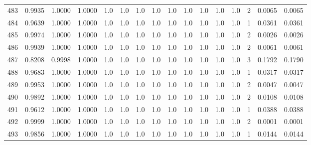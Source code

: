 \begin{tabular}{lrrrrrrrrrrrrrrr}
483 &      0.9935 &  1.0000 &  1.0000 &     1.0 &     1.0 &     1.0 &     1.0 &     1.0 &     1.0 &     1.0 &      1.0 &        1.0 &      2 &                    0.0065 &                     0.0065 \\
484 &      0.9639 &  1.0000 &  1.0000 &     1.0 &     1.0 &     1.0 &     1.0 &     1.0 &     1.0 &     1.0 &      1.0 &        1.0 &      1 &                    0.0361 &                     0.0361 \\
485 &      0.9974 &  1.0000 &  1.0000 &     1.0 &     1.0 &     1.0 &     1.0 &     1.0 &     1.0 &     1.0 &      1.0 &        1.0 &      2 &                    0.0026 &                     0.0026 \\
486 &      0.9939 &  1.0000 &  1.0000 &     1.0 &     1.0 &     1.0 &     1.0 &     1.0 &     1.0 &     1.0 &      1.0 &        1.0 &      2 &                    0.0061 &                     0.0061 \\
487 &      0.8208 &  0.9998 &  1.0000 &     1.0 &     1.0 &     1.0 &     1.0 &     1.0 &     1.0 &     1.0 &      1.0 &        1.0 &      3 &                    0.1792 &                     0.1790 \\
488 &      0.9683 &  1.0000 &  1.0000 &     1.0 &     1.0 &     1.0 &     1.0 &     1.0 &     1.0 &     1.0 &      1.0 &        1.0 &      1 &                    0.0317 &                     0.0317 \\
489 &      0.9953 &  1.0000 &  1.0000 &     1.0 &     1.0 &     1.0 &     1.0 &     1.0 &     1.0 &     1.0 &      1.0 &        1.0 &      2 &                    0.0047 &                     0.0047 \\
490 &      0.9892 &  1.0000 &  1.0000 &     1.0 &     1.0 &     1.0 &     1.0 &     1.0 &     1.0 &     1.0 &      1.0 &        1.0 &      2 &                    0.0108 &                     0.0108 \\
491 &      0.9612 &  1.0000 &  1.0000 &     1.0 &     1.0 &     1.0 &     1.0 &     1.0 &     1.0 &     1.0 &      1.0 &        1.0 &      1 &                    0.0388 &                     0.0388 \\
492 &      0.9999 &  1.0000 &  1.0000 &     1.0 &     1.0 &     1.0 &     1.0 &     1.0 &     1.0 &     1.0 &      1.0 &        1.0 &      2 &                    0.0001 &                     0.0001 \\
493 &      0.9856 &  1.0000 &  1.0000 &     1.0 &     1.0 &     1.0 &     1.0 &     1.0 &     1.0 &     1.0 &      1.0 &        1.0 &      1 &                    0.0144 &                     0.0144 \\

\end{tabular}

